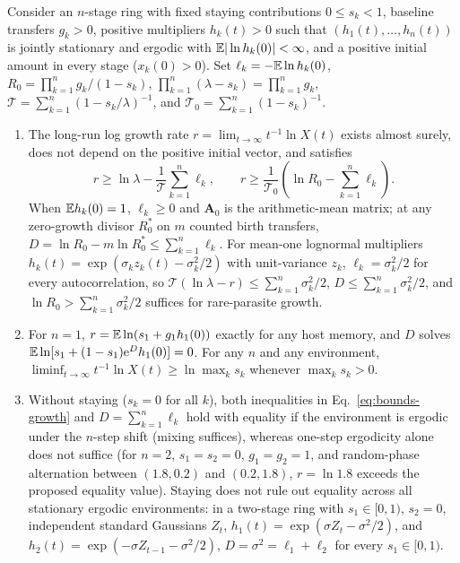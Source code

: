 \begin{proposition}\label{prop:bounds-any}
Consider an $n$-stage ring with fixed staying contributions $0 \le s_k < 1$, baseline transfers $g_k > 0$, positive multipliers $h_k(t) > 0$ such that $(h_1(t), \dots, h_n(t))$ is jointly stationary and ergodic with $\mathbb{E}|\ln h_k(0)| < \infty$, and a positive initial amount in every stage ($x_k(0) > 0$). Set $\ell_k = -\mathbb{E}\ln h_k(0)$, $R_0 = \prod_{k=1}^n g_k/(1 - s_k)$, $\prod_{k=1}^n (\lambda - s_k) = \prod_{k=1}^n g_k$, $\mathcal{T} = \sum_{k=1}^n (1 - s_k/\lambda)^{-1}$, and $\mathcal{T}_0 = \sum_{k=1}^n (1 - s_k)^{-1}$.
\begin{enumerate}
\item[(a)] The long-run log growth rate $r = \lim_{t \to \infty} t^{-1}\ln X(t)$ exists almost surely, does not depend on the positive initial vector, and satisfies
\begin{equation}
r \ge \ln\lambda - \frac{1}{\mathcal{T}}\sum_{k=1}^n \ell_k, \qquad r \ge \frac{1}{\mathcal{T}_0}\left(\ln R_0 - \sum_{k=1}^n \ell_k\right).
\label{eq:bounds-growth}
\end{equation}
When $\mathbb{E} h_k(0) = 1$, $\ell_k \ge 0$ and $\mathbf{A}_0$ is the arithmetic-mean matrix; at any zero-growth divisor $R_0^*$ on $m$ counted birth transfers, $D = \ln R_0 - m\ln R_0^* \le \sum_{k=1}^n \ell_k$. For mean-one lognormal multipliers $h_k(t) = \exp(\sigma_k z_k(t) - \sigma_k^2/2)$ with unit-variance $z_k$, $\ell_k = \sigma_k^2/2$ for every autocorrelation, so $\mathcal{T}(\ln\lambda - r) \le \sum_{k=1}^n \sigma_k^2/2$, $D \le \sum_{k=1}^n \sigma_k^2/2$, and $\ln R_0 > \sum_{k=1}^n \sigma_k^2/2$ suffices for rare-parasite growth.
\item[(b)] For $n = 1$, $r = \mathbb{E}\ln(s_1 + g_1 h_1(0))$ exactly for any host memory, and $D$ solves $\mathbb{E}\ln[s_1 + (1 - s_1)\mathrm{e}^D h_1(0)] = 0$. For any $n$ and any environment, $\liminf_{t \to \infty} t^{-1}\ln X(t) \ge \ln\max_k s_k$ whenever $\max_k s_k > 0$.
\item[(c)] Without staying ($s_k = 0$ for all $k$), both inequalities in Eq.~\eqref{eq:bounds-growth} and $D = \sum_{k=1}^n \ell_k$ hold with equality if the environment is ergodic under the $n$-step shift (mixing suffices), whereas one-step ergodicity alone does not suffice (for $n = 2$, $s_1 = s_2 = 0$, $g_1 = g_2 = 1$, and random-phase alternation between $(1.8, 0.2)$ and $(0.2, 1.8)$, $r = \ln 1.8$ exceeds the proposed equality value). Staying does not rule out equality across all stationary ergodic environments: in a two-stage ring with $s_1 \in [0, 1)$, $s_2 = 0$, independent standard Gaussians $Z_t$, $h_1(t) = \exp(\sigma Z_t - \sigma^2/2)$, and $h_2(t) = \exp(-\sigma Z_{t-1} - \sigma^2/2)$, $D = \sigma^2 = \ell_1 + \ell_2$ for every $s_1 \in [0, 1)$.
\end{enumerate}
\end{proposition}

